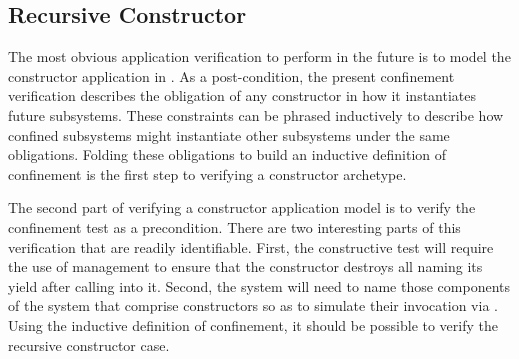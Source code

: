 \subsection{Recursive Constructor}

The most obvious application verification to perform in the future is to model the constructor application in \TMmodelName{}.
As a post-condition, the present confinement verification describes the obligation of any constructor in how it instantiates future subsystems.
These constraints can be phrased inductively to describe how confined subsystems might instantiate other subsystems under the same obligations.
Folding these obligations to build an inductive definition of confinement is the first step to verifying a constructor archetype.

The second part of verifying a constructor application model is to verify the confinement test as a precondition.
There are two interesting parts of this verification that are readily identifiable.
First, the constructive test will require the use of \TMidx{} management to ensure that the constructor destroys all \TMcaps{} naming its yield after calling into it.
Second, the system will need to name those components of the system that comprise constructors so as to simulate their invocation via \COQtx{} \TMcaps{}.
Using the inductive definition of confinement, it should be possible to verify the recursive constructor case.


